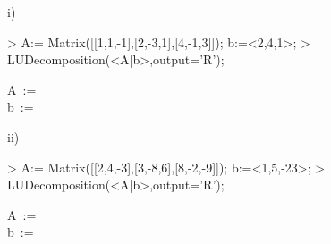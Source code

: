 \begin{enumerate}
i)
\begin{MapleInput}
> A:= Matrix([[1,1,-1],[2,-3,1],[4,-1,3]]); b:=<2,4,1>;
> LUDecomposition(<A|b>,output='R');
\end{MapleInput}
\begin{MapleOutputGather}
A\, := \,   \notag \\
b\, := \, \left[ \begin {array}{c} 2\\  4\\  1\end {array} \right]  \notag \\
  \notag
\end{MapleOutputGather}

ii)
\begin{MapleInput}
> A:= Matrix([[2,4,-3],[3,-8,6],[8,-2,-9]]); b:=<1,5,-23>;
> LUDecomposition(<A|b>,output='R');
\end{MapleInput}
\begin{MapleOutputGather}
A\, := \,   \notag \\
b\, := \, \left[ \begin {array}{c} 1\\  5\\  -23\end {array} \right]  \notag \\
  \notag
\end{MapleOutputGather}


\end{enumerate}
